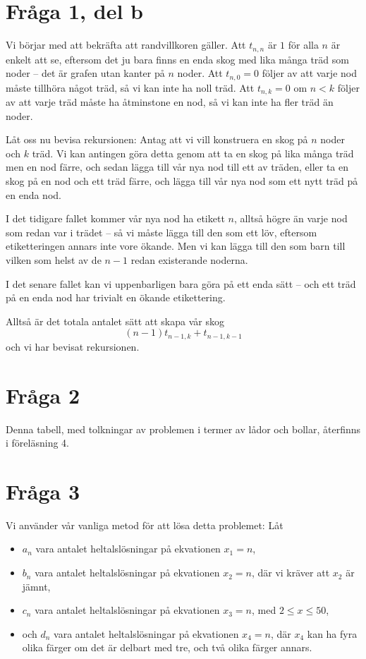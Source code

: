 \documentclass[nobib]{tufte-handout}
\begin{document}
\section{Fråga 1, del b}

Vi börjar med att bekräfta att randvillkoren gäller. Att $t_{n,n}$ är $1$ för alla $n$ är enkelt att se, eftersom det ju bara finns en enda skog med lika många träd som noder -- det är grafen utan kanter på $n$ noder. Att $t_{n,0} = 0$ följer av att varje nod måste tillhöra något träd, så vi kan inte ha noll träd. Att $t_{n,k} = 0$ om $n < k$ följer av att varje träd måste ha åtminstone en nod, så vi kan inte ha fler träd än noder.

Låt oss nu bevisa rekursionen: Antag att vi vill konstruera en skog på $n$ noder och $k$ träd. Vi kan antingen göra detta genom att ta en skog på lika många träd men en nod färre, och sedan lägga till vår nya nod till ett av träden, eller ta en skog på en nod och ett träd färre, och lägga till vår nya nod som ett nytt träd på en enda nod.

I det tidigare fallet kommer vår nya nod ha etikett $n$, alltså högre än varje nod som redan var i trädet -- så vi måste lägga till den som ett löv, eftersom etiketteringen annars inte vore ökande. Men vi kan lägga till den som barn till vilken som helst av de $n-1$ redan existerande noderna.

I det senare fallet kan vi uppenbarligen bara göra på ett enda sätt -- och ett träd på en enda nod har trivialt en ökande etikettering.

Alltså är det totala antalet sätt att skapa vår skog
$$(n-1)t_{n-1,k} + t_{n-1,k-1}$$
och vi har bevisat rekursionen.

\section{Fråga 2}

Denna tabell, med tolkningar av problemen i termer av lådor och bollar, återfinns i föreläsning 4.

\section{Fråga 3}

Vi använder vår vanliga metod för att lösa detta problemet: Låt 
\begin{itemize}
  \item $a_n$ vara antalet heltalslösningar på ekvationen $x_1 = n$,
  \item $b_n$ vara antalet heltalslösningar på ekvationen $x_2 = n$, där vi kräver att $x_2$ är jämnt,
  \item $c_n$ vara antalet heltalslösningar på ekvationen $x_3 = n$, med $2 \leq x \leq 50$,
  \item och $d_n$ vara antalet heltalslösningar på ekvationen $x_4 = n$, där $x_4$ kan ha fyra olika färger om det är delbart med tre, och två olika färger annars.
\end{itemize}
\end{document}
